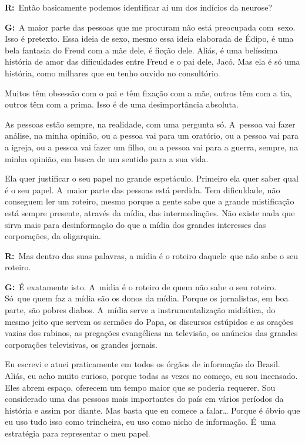  

\textbf{R:}~Então basicamente podemos identificar aí um dos indícios da
neurose?

 

\textbf{G:}~A maior parte das pessoas que me procuram não está
preocupada com\textbf{}~sexo. Isso é pretexto. Essa ideia de sexo, mesmo
essa ideia elaborada de Édipo, é uma bela fantasia do Freud com a mãe
dele, é ficção dele. Aliás, é uma belíssima história de amor das
dificuldades entre Freud e o pai dele, Jacó. Mas ela é só uma história,
como milhares que eu tenho ouvido no consultório.

 

Muitos têm obsessão com o pai e têm fixação com a mãe, outros têm com a
tia, outros têm com a prima. Isso é de uma desimportância absoluta.

 

As pessoas estão sempre, na realidade, com uma pergunta só. A~pessoa vai
fazer análise, na minha opinião, ou a pessoa vai para um oratório, ou a
pessoa vai para a igreja, ou a pessoa vai fazer um filho, ou a pessoa
vai para a guerra, sempre, na minha opinião, em busca de um sentido para
a sua vida.

 

Ela quer justificar o seu papel no grande espetáculo. Primeiro ela quer
saber qual é o seu papel. A~maior parte das pessoas está perdida. Tem
dificuldade, não conseguem ler um roteiro, mesmo porque a gente sabe que
a grande mistificação está sempre presente, através da mídia, das
intermediações. Não existe nada que sirva mais para desinformação do que
a mídia dos grandes interesses das corporações, da oligarquia.

 

\textbf{R:}~Mas dentro das suas palavras, a mídia é o roteiro
daquele\textbf{}~que não sabe o seu roteiro.

 

\textbf{G:}~É exatamente isto. A~mídia é o roteiro de quem não sabe o
seu roteiro. Só\textbf{}~que quem faz a mídia são os donos da mídia.
Porque os jornalistas, em boa parte, são pobres diabos. A~mídia serve a
instrumentalização midiática, do mesmo jeito que servem os sermões do
Papa, os discursos estúpidos e as orações vazias dos rabinos, as
pregações evangélicas na televisão, os anúncios das grandes corporações
televisivas, os grandes jornais.

 

Eu escrevi e atuei praticamente em todos os órgãos de informação do
Brasil. Aliás, eu acho muito curioso, porque todas as vezes no começo,
eu sou incensado. Eles abrem espaço, oferecem um tempo maior que se
poderia requerer. Sou considerado uma das pessoas mais importantes do
país em vários períodos da história e assim por diante. Mas basta que eu
comece a falar… Porque é óbvio que eu uso tudo isso como
trincheira, eu uso como nicho de informação. É~uma estratégia para
representar o meu papel.

